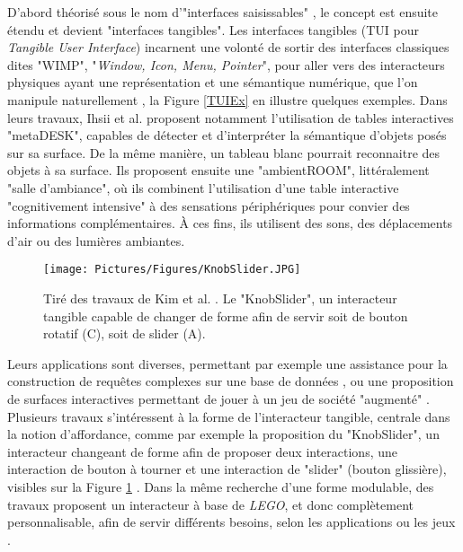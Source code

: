			D'abord théorisé sous le nom d'"interfaces saisissables" \cite{fitzmaurice_bricks_1995}, le concept est ensuite étendu et devient "interfaces tangibles". Les interfaces tangibles (TUI pour \textit{Tangible User Interface}) incarnent une volonté de sortir des interfaces classiques dites "WIMP", "\textit{Window, Icon, Menu, Pointer}", pour aller vers des interacteurs physiques ayant une représentation et une sémantique numérique, que l'on manipule naturellement \cite{ishii_tangible_1997}, la Figure \ref{TUIEx} en illustre quelques exemples. Dans leurs travaux, Ihsii et al. \cite{ishii_tangible_1997} proposent notamment l'utilisation de tables interactives "metaDESK", capables de détecter et d'interpréter la sémantique d'objets posés sur sa surface. De la même manière, un tableau blanc pourrait reconnaitre des objets à sa surface. Ils proposent ensuite une "ambientROOM", littéralement "salle d'ambiance", où ils combinent l'utilisation d'une table interactive "cognitivement intensive" à des sensations périphériques pour convier des informations complémentaires. À ces fins, ils utilisent des sons, des déplacements d'air ou des lumières ambiantes.
			
			\begin{figure}
			\centering
			\texttt{[image: Pictures/Figures/KnobSlider.JPG]}
			\caption{Tiré des travaux de Kim et al. \cite{kim_knobslider_2019}. Le "KnobSlider", un interacteur tangible capable de changer de forme afin de servir soit de bouton rotatif (C), soit de slider (A).}
			\label{KnobSlider}
		\end{figure}
			
			Leurs applications sont diverses, permettant par exemple une assistance pour la construction de requêtes complexes sur une base de données \cite{pereda_tui_2019}, ou une proposition de surfaces interactives permettant de jouer à un jeu de société "augmenté" \cite{villar_project_2018}. Plusieurs travaux s'intéressent à la forme de l'interacteur tangible, centrale dans la notion d'affordance, comme par exemple la proposition du "KnobSlider", un interacteur changeant de forme afin de proposer deux interactions, une interaction de bouton à tourner et une interaction de "slider" (bouton glissière), visibles sur la Figure \ref{KnobSlider} \cite{kim_knobslider_2019}. Dans la même recherche d'une forme modulable, des travaux proposent un interacteur à base de \textit{LEGO}, et donc complètement personnalisable, afin de servir différents besoins, selon les applications ou les jeux \cite{arora_virtualbricks_2019}.
				
